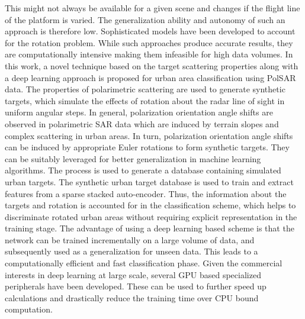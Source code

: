 This might not always be available for a given scene and changes if the flight line of the platform is varied. The generalization ability and autonomy of such an approach is therefore low. 
Sophisticated models have been developed to account for the rotation problem. While such approaches produce accurate results, they are computationally intensive making them infeasible for high data volumes.  
In this work, a novel technique based on the target scattering properties along with a deep learning approach is proposed for urban area classification using PolSAR data. The properties of polarimetric scattering are used to generate synthetic targets, which simulate the effects of rotation about the radar line of sight in uniform angular steps.
In general, polarization orientation angle shifts are observed in polarimetric SAR data which are induced by terrain slopes and complex scattering in urban areas. In turn, polarization orientation angle shifts can be induced by appropriate Euler rotations to form synthetic targets. They can be suitably leveraged for better generalization in machine learning algorithms. The process is used to generate a database containing simulated urban targets. 
The synthetic urban target database is used to train and extract features from a  sparse stacked auto-encoder. Thus, the information about the targets and rotation is accounted for in the classification scheme, which helps to discriminate rotated urban areas without requiring explicit representation in the training stage. The advantage of using a deep learning based scheme is that the network can be trained incrementally on a large volume of data, and subsequently used as a generalization for unseen data. This leads to a computationally efficient and fast classification phase. Given the commercial interests in deep learning at large scale, several GPU based specialized peripherals have been developed. These can be used to further speed up calculations and drastically reduce the training time over CPU bound computation. 




